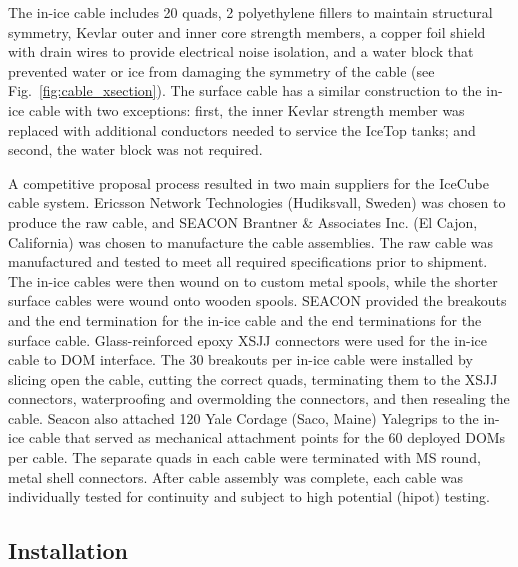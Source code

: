 The in-ice cable includes 20 quads, 2 polyethylene fillers to maintain structural
symmetry, Kevlar outer and inner core strength members, a copper foil
shield with drain wires to provide electrical noise isolation, and a water
block that prevented water or ice from damaging the symmetry of the
cable (see Fig.~\ref{fig:cable_xsection}). The surface cable has a similar
construction to the in-ice 
cable with two exceptions: first, the inner Kevlar strength member was replaced
with additional conductors needed to service the IceTop tanks; and second, the
water block was not required.

A competitive proposal process resulted in two main suppliers for the IceCube
cable system.  Ericsson Network Technologies (Hudiksvall, Sweden) was chosen
to produce the raw cable, and SEACON Brantner \& Associates Inc. (El Cajon,
California) was chosen to manufacture the cable assemblies. The raw
cable was manufactured and tested to meet all required specifications prior
to shipment.  The in-ice cables were then
wound on to custom metal spools, while the shorter surface cables were wound
onto wooden spools. SEACON provided the breakouts
and the end termination for the in-ice cable and the end
terminations for the surface cable.  Glass-reinforced epoxy XSJJ
connectors were used for the in-ice
cable to DOM interface. The 30 breakouts per in-ice cable were installed by
slicing open the cable, cutting the correct quads, terminating them to the
XSJJ connectors, waterproofing and overmolding the connectors, and then
resealing the cable. Seacon also
attached 120 Yale Cordage (Saco, Maine) Yalegrips to the in-ice
cable that served as mechanical attachment points for the 60 deployed DOMs
per cable. The separate quads in each cable were terminated with MS round,
metal shell connectors. After cable assembly was complete, 
each cable was individually tested for continuity and subject to high
potential (hipot) testing. 

\subsection{Installation}

